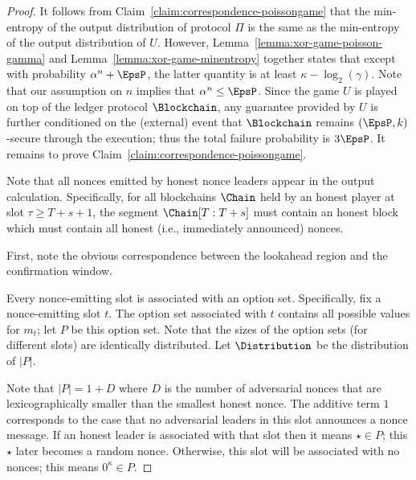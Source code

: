 \begin{proof}
	It follows from Claim~\ref{claim:correspondence-poissongame} that the 
	min-entropy of the output distribution of 
	protocol $\Pi$ 
	is the same as 
	the min-entropy of the output distribution of $U$. 
	However, 
	Lemma~\ref{lemma:xor-game-poisson-gamma} and 
	Lemma~\ref{lemma:xor-game-minentropy} together 
	states that 
	except with probability $\alpha^n + \EpsP$, 
	the latter quantity is at least $\kappa - \log_2(\gamma)$. 
	Note that our assumption on $n$ implies that $\alpha^n \leq \EpsP$.
	Since the game $U$ is played on top of 
	the ledger protocol $\Blockchain$, 
	any guarantee provided by $U$ is 
	further conditioned on the (external) event that 
	$\Blockchain$ remains $(\EpsP, k)$-secure through the execution; 
	thus the total failure probability is $3 \EpsP$.
	It remains to prove Claim~\ref{claim:correspondence-poissongame}.


		Note that all nonces emitted by honest nonce leaders appear in the output calculation. 
		Specifically, for all blockchains $\Chain$ 
		held by an honest player at slot $\tau \geq T +  s + 1$, 
		the segment $\Chain[T:T+s]$ must contain an honest block 
		which must contain all honest (i.e., immediately announced) nonces. 

		First, note the {\color{red}obvious} correspondence 
		between the lookahead region and the confirmation window.


		Every nonce-emitting slot is associated with an option set. 
		Specifically, fix a nonce-emitting slot $t$. 
		The option set associated with $t$ 
		contains all possible values for $m_t$; let $P$ be this option set. 
		Note that the sizes of the option sets (for different slots) 
		are identically distributed.
		Let $\Distribution$ be the distribution of $|P|$. 
		
		Note that 
		$|P| = 1 + D$ where $D$ is the number of adversarial nonces that are 
		lexicographically smaller than the smallest honest nonce. 
		The additive term $1$ corresponds to the case that 
		no adversarial leaders in this slot announces a nonce message. 
		If an honest leader is associated with that slot 
		then it means $\star \in P$; this $\star$ later becomes a random nonce. 
		Otherwise, this slot will be associated with no nonces; 
		this means $0^\kappa \in P$.


\end{proof}
